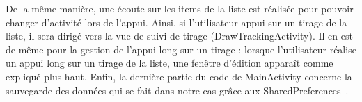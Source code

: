 \documentclass{article}
\begin{document}
\vspace{1em}
De la même manière, une écoute sur les items de la liste est réalisée pour pouvoir changer d'activité lors de l'appui. Ainsi, si l'utilisateur appui sur un tirage de la liste, il sera dirigé vers la vue de suivi de tirage (DrawTrackingActivity).
\vspace{1em}
\newline Il en est de même pour la gestion de l'appui long sur un tirage : lorsque l'utilisateur réalise un appui long sur un tirage de la liste, une fenêtre d'édition apparaît comme expliqué plus haut.
\vspace{1em}
\newline Enfin, la dernière partie du code de MainActivity concerne la sauvegarde des données qui se fait dans notre cas grâce aux SharedPreferences~\cite{sharedPreferences}.

\newpage
\end{document}
